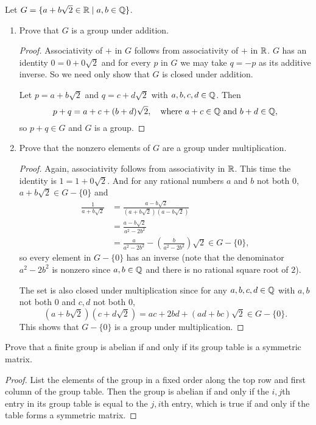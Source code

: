  Let $G = \{a + b\sqrt2\in\mathbb{R} \mid a,b\in\mathbb{Q}\}$.
\begin{enumerate}
\item Prove that $G$ is a group under addition.
  \begin{proof}
    Associativity of $+$ in $G$ follows from associativity of $+$ in
    $\mathbb{R}$. $G$ has an identity $0 = 0 + 0\sqrt2$ and for every $p$ in
    $G$ we may take $q = -p$ as its additive inverse. So we need only
    show that $G$ is closed under addition.

    Let $p = a + b\sqrt2$ and $q = c + d\sqrt2$ with
    $a,b,c,d\in\mathbb{Q}$. Then
    \begin{equation*}
      p+q = a + c + (b + d)\sqrt2,
      \quad\text{where $a+c\in\mathbb{Q}$ and $b+d\in\mathbb{Q}$},
    \end{equation*}
    so $p+q\in G$ and $G$ is a group.
  \end{proof}
\item Prove that the nonzero elements of $G$ are a group under
  multiplication.
  \begin{proof}
    Again, associativity follows from associativity in $\mathbb{R}$. This time
    the identity is $1 = 1 + 0\sqrt2$. And for any rational numbers
    $a$ and $b$ not both $0$, $a+b\sqrt2\in G-\{0\}$ and
    \begin{align*}
      \frac1{a + b\sqrt2}
      &= \frac{a - b\sqrt2}{(a + b\sqrt2)(a - b\sqrt2)} \\
      &= \frac{a - b\sqrt2}{a^2 - 2b^2} \\
      &= \frac{a}{a^2 - 2b^2} - \left(\frac{b}{a^2 - 2b^2}\right)\!\sqrt2
        \in G-\{0\},
    \end{align*}
    so every element in $G-\{0\}$ has an inverse (note that the
    denominator $a^2 - 2b^2$ is nonzero since $a,b\in\mathbb{Q}$ and there is
    no rational square root of $2$).

    The set is also closed under multiplication since for any
    $a,b,c,d\in\mathbb{Q}$ with $a,b$ not both $0$ and $c,d$ not both $0$,
    \begin{equation*}
      \left(a + b\sqrt2\right)\left(c + d\sqrt2\right)
      = ac + 2bd + (ad + bc)\sqrt2 \in G-\{0\}.
    \end{equation*}
    This shows that $G-\{0\}$ is a group under multiplication.
  \end{proof}
\end{enumerate}

 Prove that a finite group is abelian if and only if its
group table is a symmetric matrix.
\begin{proof}
  List the elements of the group in a fixed order along the top row
  and first column of the group table. Then the group is abelian if
  and only if the $i,j$th entry in its group table is equal to the
  $j,i$th entry, which is true if and only if the table forms a
  symmetric matrix.
\end{proof}


